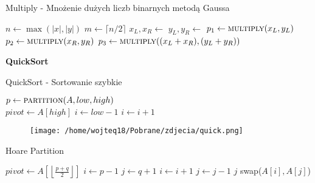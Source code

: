 \documentclass{article}
\begin{document}
\begin{algorithm}[H]
    \caption{Multiply - Mnożenie dużych liczb binarnych metodą Gaussa}
    \label{alg:multiply}
    \begin{algorithmic}[1]
            \State $n \gets \max(|x|, |y|)$ 
                \State {}
            \EndIf
            \State $m \gets \lceil {n/2} \rceil$
            \State $x_L, x_R \gets$ 
            \State $y_L, y_R \gets$ 
            \State $p_1 \gets \Call{multiply}{x_L, y_L}$
            \State $p_2 \gets \Call{multiply}{x_R, y_R}$
            \State $p_3 \gets \Call{multiply}{(x_L + x_R), (y_L + y_R)}$
            \State {}
        \EndProcedure
    \end{algorithmic}
\end{algorithm}
\textbf{QuickSort}
\begin{algorithm}[H]
    \caption{QuickSort - Sortowanie szybkie}
    \label{alg:quicksort}
    \begin{algorithmic}[1]
                \State $p \gets \Call{partition}{A, low, high}$
                \State {}
                \State {}
            \EndIf
        \EndProcedure
        \\
            \State $pivot \gets A[high]$
            \State $i \gets low - 1$
                    \State $i \gets i + 1$
                    \State {}
                \EndIf
            \EndFor
            \State {}
            \State {}
        \EndProcedure
    \end{algorithmic}
\end{algorithm}
\begin{figure}[H]
    \centering
    \texttt{[image: /home/wojteq18/Pobrane/zdjecia/quick.png]}
    \label{fig:example_image}
\end{figure}

\begin{algorithm}[H]
    \caption{Hoare Partition}
    \label{alg:quicksort}
    \begin{algorithmic}[1]
            \State $pivot \gets A\left[\left\lfloor \frac{p + q}{2} \right\rfloor\right]$
            \State $i \gets p - 1$
            \State $j \gets q + 1$
                \Repeat
                    \State $i \gets i + 1$
                \Repeat
                    \State $j \gets j - 1$
                    \State \Return $j$
                \EndIf
                \State swap($A[i], A[j]$)
            \EndWhile
        \EndProcedure
    \end{algorithmic}
\end{algorithm}
\end{document}
